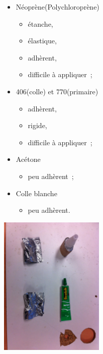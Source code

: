 \documentclass{beamer}
\begin{document}
\begin{frame}
  \begin{multicols}{2}
    \begin{itemize}
      \item Néoprène(Polychloroprène)
      \begin{itemize}
        \item étanche,
        \item élastique,
        \item adhèrent,
        \item difficile à appliquer~;
      \end{itemize}
      \item 406(colle) et 770(primaire)
      \begin{itemize}
        \item adhèrent,
        \item rigide,
        \item difficile à appliquer~;
      \end{itemize}
      \item Acétone
      \begin{itemize}
        \item peu adhèrent~;
      \end{itemize}
      \item Colle blanche
      \begin{itemize}
        \item peu adhèrent.
      \end{itemize}
    \end{itemize}
    \newpage
    \begin{center}
      \includegraphics[width=5cm]{../Images/colle.JPG}
    \end{center}
  \end{multicols}
\end{frame}
\end{document}
